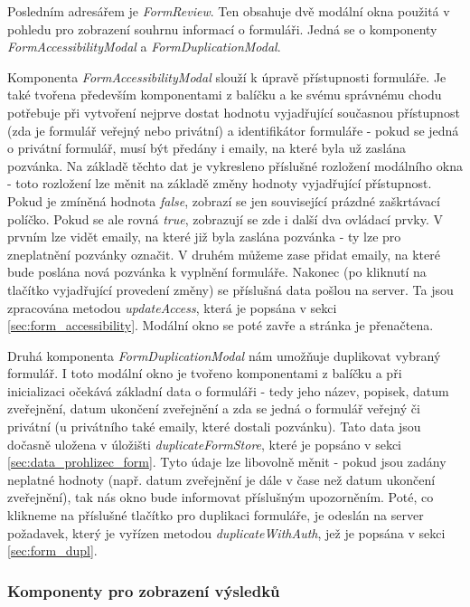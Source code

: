 			Posledním adresářem je \textit{FormReview}. Ten obsahuje dvě modální okna použitá v pohledu pro zobrazení souhrnu informací o formuláři. Jedná se o komponenty \textit{FormAccessibilityModal} a \textit{FormDuplicationModal}.
			
			Komponenta \textit{FormAccessibilityModal} slouží k úpravě přístupnosti formuláře. Je také tvořena především komponentami z balíčku  a ke svému správnému chodu potřebuje při vytvoření nejprve dostat hodnotu vyjadřující současnou přístupnost (zda je formulář veřejný nebo privátní) a identifikátor formuláře - pokud se jedná o privátní formulář, musí být předány i emaily, na které byla už zaslána pozvánka. Na základě těchto dat je vykresleno příslušné rozložení modálního okna - toto rozložení lze měnit na základě změny hodnoty vyjadřující přístupnost. Pokud je zmíněná hodnota \textit{false}, zobrazí se jen související prázdné zaškrtávací políčko. Pokud se ale rovná \textit{true}, zobrazují se zde i další dva ovládací prvky. V prvním lze vidět emaily, na které již byla zaslána pozvánka - ty lze pro zneplatnění pozvánky označit. V druhém můžeme zase přidat emaily, na které bude poslána nová pozvánka k vyplnění formuláře. Nakonec (po kliknutí na tlačítko vyjadřující provedení změny) se příslušná data pošlou na server. Ta jsou zpracována metodou \textit{updateAccess}, která je popsána v sekci \ref{sec:form_accessibility}. Modální okno se poté zavře a stránka je přenačtena.
			
			Druhá komponenta \textit{FormDuplicationModal} nám umožňuje duplikovat vybraný formulář. I toto modální okno je tvořeno komponentami z balíčku  a při inicializaci očekává základní data o formuláři - tedy jeho název, popisek, datum zveřejnění, datum ukončení zveřejnění a zda se jedná o formulář veřejný či privátní (u privátního také emaily, které dostali pozvánku). Tato data jsou dočasně uložena v úložišti \textit{duplicateFormStore}, které je popsáno v sekci \ref{sec:data_prohlizec_form}. Tyto údaje lze libovolně měnit - pokud jsou zadány neplatné hodnoty (např. datum zveřejnění je dále v čase než datum ukončení zveřejnění), tak nás okno bude informovat příslušným upozorněním. Poté, co klikneme na příslušné tlačítko pro duplikaci formuláře, je odeslán na server požadavek, který je vyřízen metodou \textit{duplicateWithAuth}, jež je popsána v sekci \ref{sec:form_dupl}.
		
		\subsubsection{Komponenty pro zobrazení výsledků} %
		
